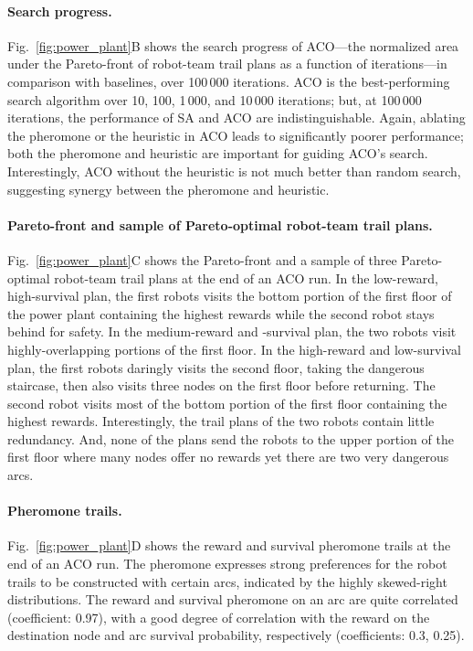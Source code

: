 \documentclass[fleqn,10pt,lineno]{wlpeerj}
\begin{document}
\paragraph{Search progress.}
Fig.~\ref{fig:power_plant}B shows the search progress of ACO---the normalized area under the Pareto-front of robot-team trail plans as a function of iterations---in comparison with baselines, over 100\,000 iterations. 
ACO is the best-performing search algorithm over 10, 100, 1\,000, and 10\,000 iterations; but, at 100\,000 iterations, the performance of SA and ACO are indistinguishable. 
Again, ablating the pheromone or the heuristic in ACO leads to significantly poorer performance; both the pheromone and heuristic are important for guiding ACO's search. Interestingly, ACO without the heuristic is not much better than random search, suggesting synergy between the pheromone and heuristic. 

\paragraph{Pareto-front and sample of Pareto-optimal robot-team trail plans.}
Fig.~\ref{fig:power_plant}C shows the Pareto-front and a sample of three Pareto-optimal robot-team trail plans at the end of an ACO run.
In the low-reward, high-survival plan, the first robots visits the bottom portion of the first floor of the power plant containing the highest rewards while the second robot stays behind for safety.
In the medium-reward and -survival plan, the two robots visit highly-overlapping portions of the first floor.
In the high-reward and low-survival plan, the first robots daringly visits the second floor, taking the dangerous staircase, then also visits three nodes on the first floor before returning. The second robot visits most of the bottom portion of the first floor containing the highest rewards.
Interestingly, the trail plans of the two robots contain little redundancy. And, none of the plans send the robots to the upper portion of the first floor where many nodes offer no rewards yet there are two very dangerous arcs.

\paragraph{Pheromone trails.}
Fig.~\ref{fig:power_plant}D shows the reward and survival pheromone trails at the end of an ACO run.
The pheromone expresses strong preferences for the robot trails to be constructed with certain arcs, indicated by the highly skewed-right distributions.
The reward and survival pheromone on an arc are quite correlated (coefficient: 0.97), with a good degree of correlation with the reward on the destination node and arc survival probability, respectively (coefficients: 0.3, 0.25).
\end{document}
